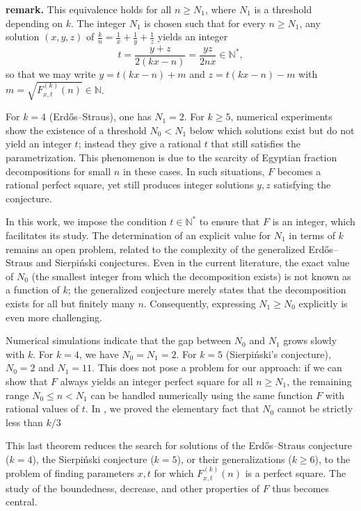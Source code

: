 \documentclass[12pt]{article}
\begin{document}
  \noindent\textbf{remark.} 
This equivalence holds for all \(n \ge N_1\), where \(N_1\) is a threshold depending on \(k\). The integer \(N_1\) is chosen such that for every \(n \ge N_1\), any solution \((x,y,z)\) of \(\frac{k}{n} = \frac{1}{x} + \frac{1}{y} + \frac{1}{z}\) yields an integer 
\[
t = \frac{y+z}{2(kx-n)} = \frac{yz}{2nx} \in \mathbb{N}^*,
\]
so that we may write \(y = t(kx-n) + m\) and \(z = t(kx-n) - m\) with \(m = \sqrt{F_{x,t}^{(k)}(n)} \in \mathbb{N}\).

For \(k = 4\) (Erdős--Straus), one has \(N_1 = 2\). For \(k \ge 5\), numerical experiments show the existence of a threshold \(N_0 < N_1\) below which solutions exist but do not yield an integer \(t\); instead they give a rational \(t\) that still satisfies the parametrization. This phenomenon is due to the scarcity of Egyptian fraction decompositions for small \(n\) in these cases. In such situations, \(F\) becomes a rational perfect square, yet still produces integer solutions \(y,z\) satisfying the conjecture.

In this work, we impose the condition \(t \in \mathbb{N}^*\) to ensure that \(F\) is an integer, which facilitates its study. The determination of an explicit value for \(N_1\) in terms of \(k\) remains an open problem, related to the complexity of the generalized Erdős--Straus and Sierpiński conjectures. Even in the current literature, the exact value of \(N_0\) (the smallest integer from which the decomposition exists) is not known as a function of \(k\); the generalized conjecture merely states that the decomposition exists for all but finitely many \(n\). Consequently, expressing \(N_1 \ge N_0\) explicitly is even more challenging.

Numerical simulations indicate that the gap between \(N_0\) and \(N_1\) grows slowly with \(k\). For \(k=4\), we have \(N_0 = N_1 = 2\). For \(k=5\) (Sierpiński's conjecture), \(N_0 = 2\) and \(N_1 = 11\). This does not pose a problem for our approach: if we can show that \(F\) always yields an integer perfect square for all \(n \ge N_1\), the remaining range \(N_0 \le n < N_1\) can be handled numerically using the same function \(F\) with rational values of \(t\). In  \cite{1}, we proved the elementary fact that \(N_0\) cannot be strictly less than \(k/3\)


\medskip


This last theorem reduces the search for solutions of the Erdős--Straus conjecture (\(k=4\)), the Sierpiński conjecture (\(k=5\)), or their generalizations (\(k \ge 6\)), to the problem of finding parameters \(x,t\) for which \(F_{x,t}^{(k)}(n)\) is a perfect square. 
The study of the boundedness, decrease, and other properties of \(F\) thus becomes central.
\end{document}
